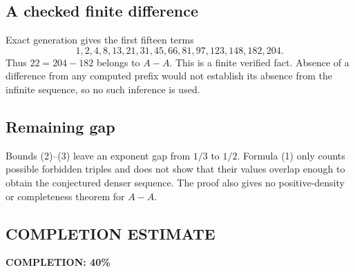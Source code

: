 \subsection*{A checked finite difference}
Exact generation gives the first fifteen terms
\[
 1,2,4,8,13,21,31,45,66,81,97,123,148,182,204.
\]
Thus $22=204-182$ belongs to $A-A$. This is a finite verified fact. Absence of a difference from any computed prefix would not establish its absence from the infinite sequence, so no such inference is used.

\subsection*{Remaining gap}
Bounds (2)--(3) leave an exponent gap from $1/3$ to $1/2$. Formula (1) only counts possible forbidden triples and does not show that their values overlap enough to obtain the conjectured denser sequence. The proof also gives no positive-density or completeness theorem for $A-A$.
\subsection*{COMPLETION ESTIMATE}
\textbf{COMPLETION: 40\%}
